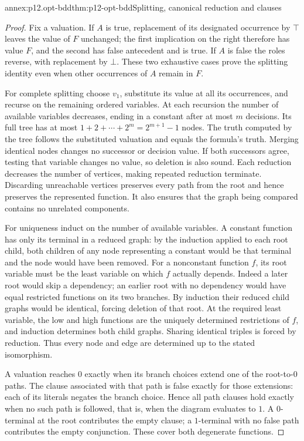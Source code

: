 \begin{annexitem}{annex:p12.opt-bdd}{thm:p12-opt-bdd}{Splitting, canonical reduction and clauses}
\begin{proof}
Fix a valuation. If \(A\) is true, replacement of its designated
occurrence by \(\top\) leaves the value of \(F\) unchanged;
the first implication on the right therefore has value \(F\),
and the second has false antecedent and is true.
If \(A\) is false the roles reverse, with replacement by \(\bot\).
These two exhaustive cases prove the splitting identity even
when other occurrences of \(A\) remain in \(F\).

For complete splitting choose \(v_1\), substitute its value at
all its occurrences, and recurse on the remaining ordered variables.
At each recursion the number of available variables decreases,
ending in a constant after at most \(m\) decisions.
Its full tree has at most \(1+2+\cdots+2^m=2^{m+1}-1\)
nodes. The truth computed by the tree follows the substituted
valuation and equals the formula's truth.
Merging identical nodes changes no successor or decision value.
If both successors agree, testing that variable changes no value,
so deletion is also sound. Each reduction decreases the number
of vertices, making repeated reduction terminate.
Discarding unreachable vertices preserves every path from the root
and hence preserves the represented function. It also ensures that
the graph being compared contains no unrelated components.

For uniqueness induct on the number of available variables.
A constant function has only its terminal in a reduced graph:
by the induction applied to each root child, both children of
any node representing a constant would be that terminal and the
node would have been removed.
For a nonconstant function \(f\), its root variable must be the
least variable on which \(f\) actually depends. Indeed a later
root would skip a dependency; an earlier root with no dependency
would have equal restricted functions on its two branches.
By induction their reduced child graphs would be identical,
forcing deletion of that root. At the required least variable,
the low and high functions are the uniquely determined restrictions
of \(f\), and induction determines both child graphs. Sharing
identical triples is forced by reduction. Thus every node and
edge are determined up to the stated isomorphism.

A valuation reaches \(0\) exactly when its branch choices extend
one of the root-to-\(0\) paths. The clause associated with that
path is false exactly for those extensions: each of its literals
negates the branch choice. Hence all path clauses hold exactly
when no such path is followed, that is, when the diagram evaluates
to \(1\). A \(0\)-terminal at the root contributes the empty
clause; a \(1\)-terminal with no false path contributes the empty
conjunction. These cover both degenerate functions.
\end{proof}
\end{annexitem}
